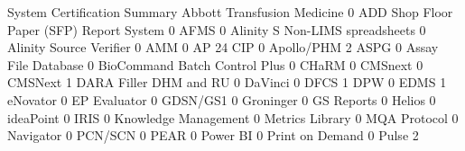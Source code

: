 \documentclass{article}
\begin{document}
\begin{Schunk}
\begin{Soutput}
                                           System Certification Summary
  Abbott Transfusion Medicine                                         0
  ADD Shop Floor Paper (SFP) Report System                            0
  AFMS                                                                0
  Alinity S Non-LIMS spreadsheets                                     0
  Alinity Source Verifier                                             0
  AMM                                                                 0
  AP 24 CIP                                                           0
  Apollo/PHM                                                          2
  ASPG                                                                0
  Assay File Database                                                 0
  BioCommand Batch Control Plus                                       0
  CHaRM                                                               0
  CMSnext                                                             0
  CMSNext                                                             1
  DARA Filler DHM and RU                                              0
  DaVinci                                                             0
  DFCS                                                                1
  DPW                                                                 0
  EDMS                                                                1
  eNovator                                                            0
  EP Evaluator                                                        0
  GDSN/GS1                                                            0
  Groninger                                                           0
  GS Reports                                                          0
  Helios                                                              0
  ideaPoint                                                           0
  IRIS                                                                0
  Knowledge Management                                                0
  Metrics Library                                                     0
  MQA Protocol                                                        0
  Navigator                                                           0
  PCN/SCN                                                             0
  PEAR                                                                0
  Power BI                                                            0
  Print on Demand                                                     0
  Pulse                                                               2

\end{Soutput}
\end{Schunk}
\end{document}
